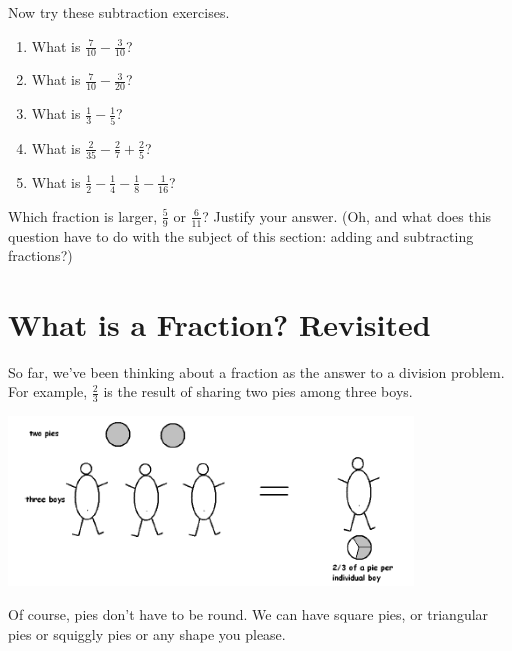 Now try these subtraction exercises.
\begin{enumerate}
\addtocounter{enumi}{6}

\item
What is $\frac 7{10} - \frac 3{10}$?\\

\item
What is $\frac 7{10} - \frac {3}{20}$?\\

\item
What is $\frac 1 3 - \frac 1{5}$?\\

\item
What is $\frac 2 {35} - \frac 2 7 + \frac 2 5 $?\\

\item
What is $\frac 1 2 - \frac 1 4 - \frac 1 8 - \frac 1 {16}$?\\
\end{enumerate}


\begin{thinkpair*}
Which fraction is larger, $\frac 5 9 $ or $\frac 6{11}$?  Justify your answer.
(Oh, and what does this question have to do with the subject of this section: adding and subtracting fractions?)
\end{thinkpair*}





\section{What is a Fraction? Revisited}
So far, we've been thinking about a fraction as the answer to a division problem.  For example,  $\frac 2 3$ is the result of sharing two pies among three boys.

   \begin{center}
\includegraphics[height = 4.5cm]{2pies3boys}
\end{center}

Of course, pies don't have to be round.  We can have square pies, or triangular pies or squiggly pies or any shape you please.


